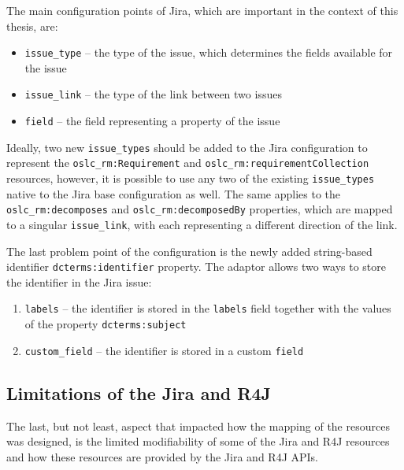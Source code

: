 The main configuration points of Jira, which are important in the context of this thesis, are:

\begin{itemize}
  \item \texttt{issue\_type} -- the type of the issue, which determines the fields available for the issue
  \item \texttt{issue\_link} -- the type of the link between two issues
  \item \texttt{field} -- the field representing a property of the issue
\end{itemize}

Ideally, two new \texttt{issue\_types} should be added to the Jira configuration to represent the \texttt{oslc\_rm:Requirement} and \texttt{oslc\_rm:requirementCollection} resources, however, it is possible to use any two of the existing \texttt{issue\_types} native to the Jira base configuration as well. The same applies to the \texttt{oslc\_rm:decomposes} and \texttt{oslc\_rm:decomposedBy} properties, which are mapped to a singular \texttt{issue\_link}, with each representing a different direction of the link.

The last problem point of the configuration is the newly added string-based identifier \texttt{dcterms:identifier} property. The adaptor allows two ways to store the identifier in the Jira issue:

\begin{enumerate}
  \item \texttt{labels} -- the identifier is stored in the \texttt{labels} field together with the values of the property \texttt{dcterms:subject}
  \item \texttt{custom\_field} -- the identifier is stored in a custom \texttt{field}
\end{enumerate}

\subsection*{Limitations of the Jira and R4J}
The last, but not least, aspect that impacted how the mapping of the resources was designed, is the limited modifiability of some of the Jira and R4J resources and how these resources are provided by the Jira and R4J APIs.

